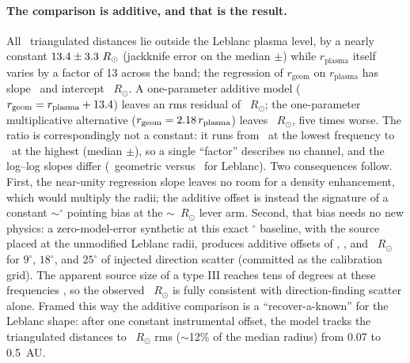 \documentclass[twocolumn]{aastex631}
\begin{document}
\paragraph{The comparison is additive, and that is the result.} All \triNtri\ triangulated
distances lie outside the Leblanc plasma level, by a nearly constant
$13.4\pm3.3~R_\odot$ (jackknife error on the median $\pm$\triDiffJkSe) while
$r_\mathrm{plasma}$ itself varies by a factor of 13 across the band; the regression of
$r_\mathrm{geom}$ on $r_\mathrm{plasma}$ has slope \triOlsSlope\ and intercept
\triOlsIntercept~$R_\odot$. A one-parameter additive model ($r_\mathrm{geom}=r_\mathrm{plasma}
+13.4$) leaves an rms residual of \triRmsAdd~$R_\odot$; the one-parameter multiplicative
alternative ($r_\mathrm{geom}=2.18\,r_\mathrm{plasma}$) leaves \triRmsMul~$R_\odot$,
five times worse. The ratio is correspondingly not a constant: it runs from \triRatioMin\ at the
lowest frequency to \triRatioMax\ at the highest (median \triRatio$\pm$\triRatioJkSe), so a
single ``factor'' describes no channel, and the log--log slopes differ
(\triSlopeGeom\ geometric versus \triSlopePlasma\ for Leblanc). Two consequences follow. First,
the near-unity regression slope leaves no room for a density enhancement, which would
multiply the radii; the additive offset is instead the signature of a constant
$\sim$\triBiasDeg$^\circ$ pointing bias at the $\sim$\triLever~$R_\odot$ lever arm. Second, that
bias needs no new physics: a zero-model-error synthetic at this exact \triSep$^\circ$ baseline,
with the source placed at the unmodified Leblanc radii, produces additive offsets of
\triCalibNineDiff, \triCalibEighteenDiff, and \triCalibTwentyFiveDiff~$R_\odot$ for $9^\circ$,
$18^\circ$, and $25^\circ$ of injected direction scatter (committed as the calibration grid).
The apparent source size of a type III reaches tens of degrees at these frequencies
\citep{krupar2014}, so the observed \triDiffMed~$R_\odot$ is fully consistent with
direction-finding scatter alone. Framed this way the additive comparison is a
``recover-a-known'' for the Leblanc shape: after one constant instrumental offset, the model
tracks the triangulated distances to
\triRmsAdd~$R_\odot$ rms ($\sim$12\% of the median radius) from 0.07 to 0.5~AU.
\end{document}
